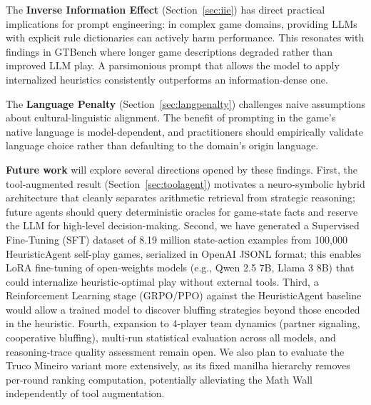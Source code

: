 \documentclass[11pt]{article}
\begin{document}
The \textbf{Inverse Information Effect} (Section~\ref{sec:iie}) has direct practical implications for prompt engineering: in complex game domains, providing LLMs with explicit rule dictionaries can actively harm performance. This resonates with findings in GTBench \cite{duan2024gtbench} where longer game descriptions degraded rather than improved LLM play. A parsimonious prompt that allows the model to apply internalized heuristics consistently outperforms an information-dense one.

The \textbf{Language Penalty} (Section~\ref{sec:langpenalty}) challenges naive assumptions about cultural-linguistic alignment. The benefit of prompting in the game's native language is model-dependent, and practitioners should empirically validate language choice rather than defaulting to the domain's origin language.

\textbf{Future work} will explore several directions opened by these findings. First, the tool-augmented result (Section~\ref{sec:toolagent}) motivates a neuro-symbolic hybrid architecture that cleanly separates arithmetic retrieval from strategic reasoning; future agents should query deterministic oracles for game-state facts and reserve the LLM for high-level decision-making. Second, we have generated a Supervised Fine-Tuning (SFT) dataset of 8.19 million state-action examples from 100,000 HeuristicAgent self-play games, serialized in OpenAI JSONL format; this enables LoRA fine-tuning of open-weights models (e.g., Qwen 2.5 7B, Llama 3 8B) that could internalize heuristic-optimal play without external tools. Third, a Reinforcement Learning stage (GRPO/PPO) against the HeuristicAgent baseline would allow a trained model to discover bluffing strategies beyond those encoded in the heuristic. Fourth, expansion to 4-player team dynamics (partner signaling, cooperative bluffing), multi-run statistical evaluation across all models, and reasoning-trace quality assessment remain open. We also plan to evaluate the Truco Mineiro variant more extensively, as its fixed manilha hierarchy removes per-round ranking computation, potentially alleviating the Math Wall independently of tool augmentation.



\end{document}
